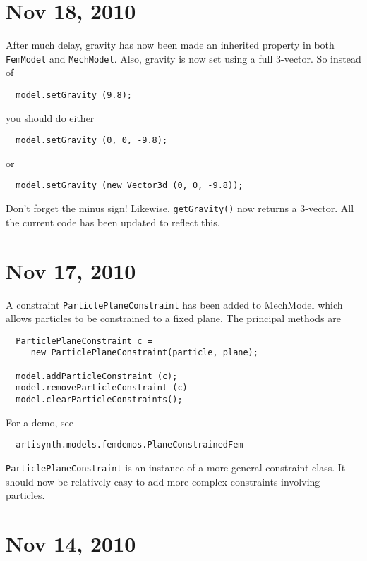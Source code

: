\documentclass{article}
\begin{document}
\section*{Nov 18, 2010}

After much delay, gravity has now been made an inherited property in
both {\tt FemModel} and {\tt MechModel}. Also, gravity is now set using a full
3-vector. So instead of 

\begin{verbatim}
  model.setGravity (9.8);
\end{verbatim}

you should do either

\begin{verbatim}
  model.setGravity (0, 0, -9.8);
\end{verbatim}

or

\begin{verbatim}
  model.setGravity (new Vector3d (0, 0, -9.8));
\end{verbatim}

Don't forget the minus sign! Likewise, {\tt getGravity()} now returns a
3-vector. All the current code has been updated to reflect this.

\section*{Nov 17, 2010}

A constraint {\tt ParticlePlaneConstraint} has been added to MechModel
which allows particles to be constrained to a fixed plane. The
principal methods are

\begin{lstlisting}
  ParticlePlaneConstraint c = 
     new ParticlePlaneConstraint(particle, plane);

  model.addParticleConstraint (c);
  model.removeParticleConstraint (c)
  model.clearParticleConstraints();
\end{lstlisting}

For a demo, see

\begin{verbatim}
  artisynth.models.femdemos.PlaneConstrainedFem
\end{verbatim}

{\tt ParticlePlaneConstraint} is an instance of a more general constraint
class. It should now be relatively easy to add more complex
constraints involving particles.

\section*{Nov 14, 2010}
\end{document}
